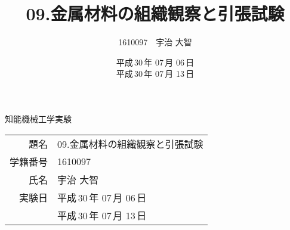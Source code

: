 \documentclass[a4paper]{jsarticle}
\begin{document}
\begin{titlepage}
\begin{center}
\vspace*{12pt}
{\huge 知能機械工学実験}
\vspace{12pt}\\
{\LARGE
\begin{tabular}{rl}
題名&09.金属材料の組織観察と引張試験\\
学籍番号&1610097\\
氏名&宇治 大智\\
実験日&平成\,30\,年 07\,月 06\,日\\
&平成\,30\,年 07\,月 13\,日
\end{tabular}\\
}
\end{center}
\end{titlepage}


\title{09.金属材料の組織観察と引張試験}
\author{1610097　宇治 大智}
\date{平成\,30\,年 07\,月 06\,日\\平成\,30\,年 07\,月 13\,日}
\maketitle

%
%


%
%
%

%
%


%
%


%
%


%
%


%
%


%
%
\begin{thebibliography}{9}
\end{thebibliography}
\end{document}

